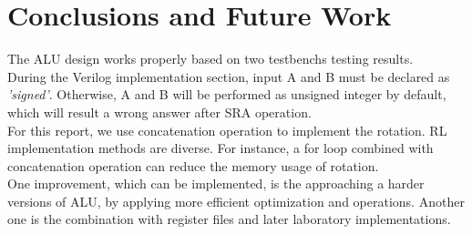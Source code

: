 \documentclass[11pt,fleqn]{article}
\begin{document}
\section{Conclusions and Future Work}
\label{sec:concl}
The ALU design works properly based on two testbenchs testing results.
\\ 
During the Verilog implementation section, input A and B must be declared as \emph{'signed'}. Otherwise, A and B will be performed as unsigned integer by default, which will result a wrong answer after SRA operation.
\\
For this report, we use concatenation operation to implement the rotation. RL implementation methods are diverse. For instance, a for loop combined with concatenation operation can reduce the memory usage of rotation.
\\
One improvement, which can be implemented, is the approaching a harder versions of ALU, by applying more efficient optimization and operations.
Another one is the combination with register files and later laboratory implementations.
\end{document}
